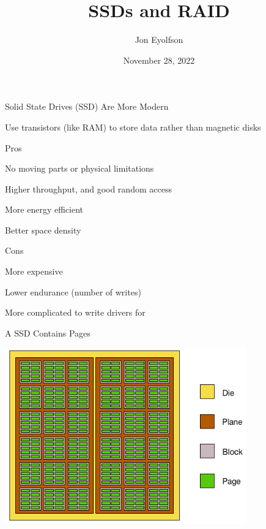 

\title{SSDs and RAID}
\author{Jon Eyolfson}
\date{November 28, 2022}


  \begin{frame}
    \titlepage
  \end{frame}

  \begin{frame}{Solid State Drives (SSD) Are More Modern}

    Use transistors (like RAM) to store data rather than magnetic disks

    \vspace{2em}

    Pros

    \hspace{2em} No moving parts or physical limitations

    \hspace{2em} Higher throughput, and good random access

    \hspace{2em} More energy efficient

    \hspace{2em} Better space density

    \vspace{2em}

    Cons

    \hspace{2em} More expensive

    \hspace{2em} Lower endurance (number of writes)

    \hspace{2em} More complicated to write drivers for
  \end{frame}

  \begin{frame}{A SSD Contains Pages}
    \begin{center}
      \includegraphics[height=0.8\textheight]{ssd.png}    
    \end{center}
  \end{frame}

